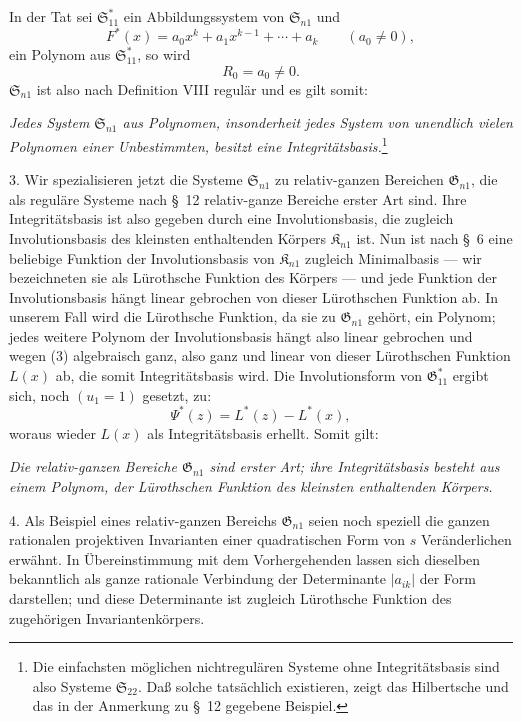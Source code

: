 \documentclass[11pt]{article}
\providecommand{\Kfield}{\mathfrak{K}}
\providecommand{\Ssys}{\mathfrak{S}}
\providecommand{\Gdom}{\mathfrak{G}}
\begin{document}
In der Tat sei $\Ssys^*_{11}$ ein Abbildungssystem von $\Ssys_{n1}$ und
\[
  F^*(x)=a_0x^k+a_1x^{k-1}+\cdots+a_k\qquad(a_0\ne0),
\]
ein Polynom aus $\Ssys^*_{11}$, so wird
\begin{equation}
  R_0=a_0\ne0.
\tag{3}
\end{equation}
$\Ssys_{n1}$ ist also nach Definition VIII regulär und es gilt somit:

\emph{Jedes System $\Ssys_{n1}$ aus Polynomen, insonderheit jedes System von unendlich vielen Polynomen einer Unbestimmten, besitzt eine Integritätsbasis.}\footnote{Die einfachsten möglichen nichtregulären Systeme ohne Integritätsbasis sind also Systeme $\Ssys_{22}$. Daß solche tatsächlich existieren, zeigt das Hilbertsche und das in der Anmerkung zu \S\ 12 gegebene Beispiel.}

3. Wir spezialisieren jetzt die Systeme $\Ssys_{n1}$ zu relativ-ganzen Bereichen $\Gdom_{n1}$, die als reguläre Systeme nach \S\ 12 relativ-ganze Bereiche erster Art sind. Ihre Integritätsbasis ist also gegeben durch eine Involutionsbasis, die zugleich Involutionsbasis des kleinsten enthaltenden Körpers $\Kfield_{n1}$ ist. Nun ist nach \S\ 6 eine beliebige Funktion der Involutionsbasis von $\Kfield_{n1}$ zugleich Minimalbasis --- wir bezeichneten sie als Lürothsche Funktion des Körpers --- und jede Funktion der Involutionsbasis hängt linear gebrochen von dieser Lürothschen Funktion ab. In unserem Fall wird die Lürothsche Funktion, da sie zu $\Gdom_{n1}$ gehört, ein Polynom; jedes weitere Polynom der Involutionsbasis hängt also linear gebrochen und wegen (3) algebraisch ganz, also ganz und linear von dieser Lürothschen Funktion $L(x)$ ab, die somit Integritätsbasis wird. Die Involutionsform von $\Gdom^*_{11}$ ergibt sich, noch $(u_1=1)$ gesetzt, zu:
\[
  \Psi^*(z)=L^*(z)-L^*(x),
\]
woraus wieder $L(x)$ als Integritätsbasis erhellt. Somit gilt:

\emph{Die relativ-ganzen Bereiche $\Gdom_{n1}$ sind erster Art; ihre Integritätsbasis besteht aus einem Polynom, der Lürothschen Funktion des kleinsten enthaltenden Körpers.}

4. Als Beispiel eines relativ-ganzen Bereichs $\Gdom_{n1}$ seien noch speziell die ganzen rationalen projektiven Invarianten einer quadratischen Form von $s$ Veränderlichen erwähnt. In Übereinstimmung mit dem Vorhergehenden lassen sich dieselben bekanntlich als ganze rationale Verbindung der Determinante $|a_{ik}|$ der Form darstellen; und diese Determinante ist zugleich Lürothsche Funktion des zugehörigen Invariantenkörpers.
\end{document}
